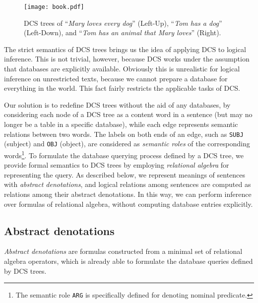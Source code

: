 \documentclass[11pt]{article}
\begin{document}
\begin{figure}[t]
\centering
\texttt{[image: book.pdf]}
\caption{DCS trees of ``\textit{Mary loves every dog}'' (Left-Up), ``\textit{Tom has a dog}'' (Left-Down), 
and ``\textit{Tom has an animal that Mary loves}'' (Right).}
\label{fig:book}
\end{figure}

The strict semantics of DCS trees brings us the idea of applying DCS
to logical inference. This is not trivial, however, because
DCS works under the assumption that databases are explicitly available.  
Obviously this is unrealistic for logical inference on
unrestricted texts, because we cannot prepare a database for everything 
in the world.  This fact fairly restricts the applicable tasks of DCS.

Our solution is to redefine DCS trees without the aid of any databases, 
by considering each node of a DCS tree as a content word in a sentence 
(but may no longer be a table in a specific database), 
while each edge represents semantic relations between two words. 
The labels on both ends of an edge, such as \texttt{SUBJ} (subject) and 
\texttt{OBJ} (object), are considered as \emph{semantic roles} of the 
corresponding words\footnote{The semantic role 
\texttt{ARG} is specifically defined for denoting nominal 
predicate.}. To formulate the database querying process defined by a 
DCS tree, we provide formal semantics to DCS trees by employing
\emph{relational algebra} \cite{Codd70} for representing the query. 
As described below, we represent meanings of sentences with 
\emph{abstract denotations}, and logical relations among sentences are computed 
as relations among their abstract denotations. In this way, we can 
perform inference over formulas of
relational algebra, without computing database entries explicitly.

\subsection{Abstract denotations}
\label{sec:abstdenno}

\emph{Abstract denotations} are formulas constructed from a minimal set of relational 
algebra \cite{Codd70} operators, which is already able to formulate the database queries 
defined by DCS trees. 
\end{document}
